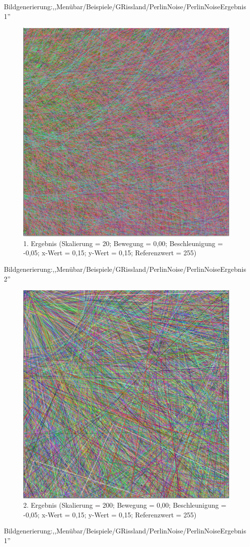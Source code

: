 \documentclass[../mciAusarbeitung.tex]{subfiles}
\begin{document}
 Bildgenerierung:,,Menübar/Beispiele/GRissland/PerlinNoise/PerlinNoiseErgebnis1''\\  
 \begin{figure}[H]
\centering
\includegraphics[width=0.5\linewidth]{"Perlin_default_iteration10.png"}
\caption[Perlin Noise-Beispiel1]{1. Ergebnis (Skalierung = 20; Bewegung = 0,00; Beschleunigung = -0,05; x-Wert = 0,15; y-Wert = 0,15; Referenzwert = 255)}
\end{figure} 
 Bildgenerierung:,,Menübar/Beispiele/GRissland/PerlinNoise/PerlinNoiseErgebnis2''\\
  \begin{figure}[H]
\centering
\includegraphics[width=0.5\linewidth]{"Perlin_Skalierung200.png"}
\caption[Perlin Noise-Beispiel2]{2. Ergebnis (Skalierung = 200; Bewegung = 0,00; Beschleunigung = -0,05; x-Wert = 0,15; y-Wert = 0,15; Referenzwert = 255)}
\end{figure}
 Bildgenerierung:,,Menübar/Beispiele/GRissland/PerlinNoise/PerlinNoiseErgebnis1''\\
\end{document}
